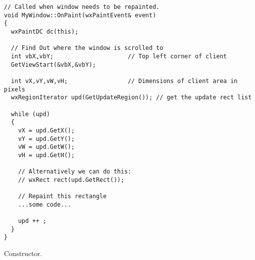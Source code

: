 {\small%
\begin{verbatim}
// Called when window needs to be repainted.
void MyWindow::OnPaint(wxPaintEvent& event)
{
  wxPaintDC dc(this);

  // Find Out where the window is scrolled to
  int vbX,vbY;                     // Top left corner of client
  GetViewStart(&vbX,&vbY);

  int vX,vY,vW,vH;                 // Dimensions of client area in pixels
  wxRegionIterator upd(GetUpdateRegion()); // get the update rect list

  while (upd)
  {
    vX = upd.GetX();
    vY = upd.GetY();
    vW = upd.GetW();
    vH = upd.GetH();

    // Alternatively we can do this:
    // wxRect rect(upd.GetRect());

    // Repaint this rectangle
    ...some code...

    upd ++ ;
  }
}
\end{verbatim}
}%



\label{wxpainteventctor}


Constructor.

